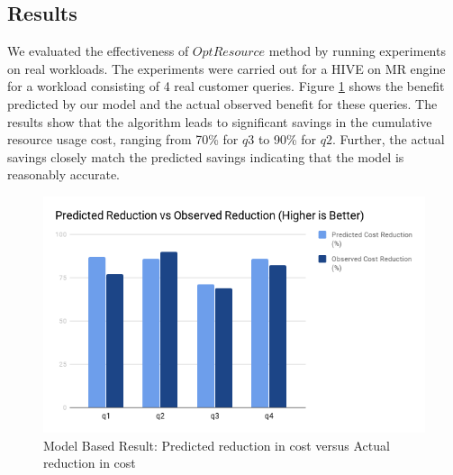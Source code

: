 \subsection{Results}
We evaluated the effectiveness of $OptResource$ method by running experiments on real workloads. The experiments were carried out for a HIVE on MR engine for a workload consisting of 4 real customer queries. 
Figure \ref{fig:modelbasedresult} shows the benefit predicted by our model and the actual observed benefit for these queries. The results show that the algorithm leads to significant savings in the cumulative resource usage cost, ranging from 70\% for $q3$ to 90\% for $q2$. Further, the actual savings closely match the predicted savings indicating that the model is reasonably accurate.

\begin{figure}[h]
	\includegraphics[width=\linewidth]{chart.png}
	\caption{Model Based Result: Predicted reduction in cost versus Actual reduction in cost}
	\label{fig:modelbasedresult}
\end{figure}
